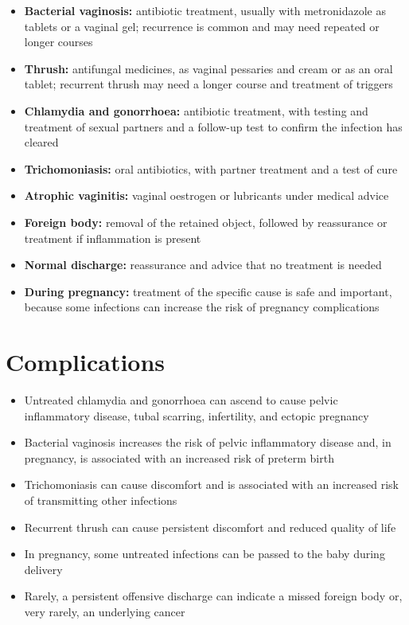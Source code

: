 \begin{itemize}
    \item \textbf{Bacterial vaginosis:} antibiotic treatment, usually with metronidazole as tablets or a vaginal gel; recurrence is common and may need repeated or longer courses
    \item \textbf{Thrush:} antifungal medicines, as vaginal pessaries and cream or as an oral tablet; recurrent thrush may need a longer course and treatment of triggers
    \item \textbf{Chlamydia and gonorrhoea:} antibiotic treatment, with testing and treatment of sexual partners and a follow-up test to confirm the infection has cleared
    \item \textbf{Trichomoniasis:} oral antibiotics, with partner treatment and a test of cure
    \item \textbf{Atrophic vaginitis:} vaginal oestrogen or lubricants under medical advice
    \item \textbf{Foreign body:} removal of the retained object, followed by reassurance or treatment if inflammation is present
    \item \textbf{Normal discharge:} reassurance and advice that no treatment is needed
    \item \textbf{During pregnancy:} treatment of the specific cause is safe and important, because some infections can increase the risk of pregnancy complications
\end{itemize}

\section*{Complications}
\begin{itemize}
    \item Untreated chlamydia and gonorrhoea can ascend to cause pelvic inflammatory disease, tubal scarring, infertility, and ectopic pregnancy
    \item Bacterial vaginosis increases the risk of pelvic inflammatory disease and, in pregnancy, is associated with an increased risk of preterm birth
    \item Trichomoniasis can cause discomfort and is associated with an increased risk of transmitting other infections
    \item Recurrent thrush can cause persistent discomfort and reduced quality of life
    \item In pregnancy, some untreated infections can be passed to the baby during delivery
    \item Rarely, a persistent offensive discharge can indicate a missed foreign body or, very rarely, an underlying cancer
\end{itemize}

